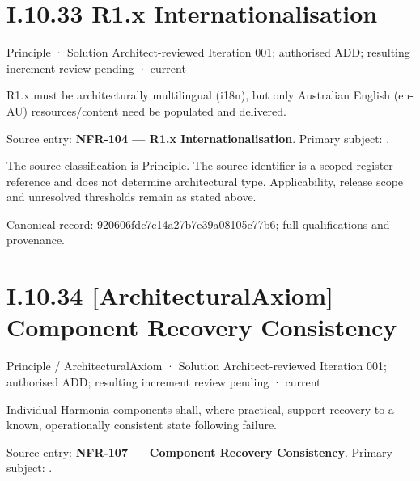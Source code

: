 \section*{I.10.33 R1.x Internationalisation}
\label{navigation:I.10.33}

\label{element:920606fdc7c14a27b7e39a08105c77b6}
{\small Principle · Solution Architect-reviewed Iteration 001; authorised ADD; resulting increment review pending · current}\par

R1.x must be architecturally multilingual (i18n), but only Australian English (en-AU) resources/content need be populated and delivered.



Source entry: \textbf{NFR-104 — R1.x Internationalisation}. Primary subject: \texttt{}.



The source classification is Principle. The source identifier is a scoped register reference and does not determine architectural type. Applicability, release scope and unresolved thresholds remain as stated above.


{\footnotesize \href{../../../../continuum/motivation/principle/920606fdc7c14a27b7e39a08105c77b6.md}{Canonical record: 920606fdc7c14a27b7e39a08105c77b6}; full qualifications and provenance.}\par
\section*{I.10.34 [ArchitecturalAxiom] Component Recovery Consistency}
\label{navigation:I.10.34}

\label{element:545465b03f794a509c932bd3126fbe57}
{\small Principle / ArchitecturalAxiom · Solution Architect-reviewed Iteration 001; authorised ADD; resulting increment review pending · current}\par

Individual Harmonia components shall, where practical, support recovery to a known, operationally consistent state following failure.



Source entry: \textbf{NFR-107 — Component Recovery Consistency}. Primary subject: \texttt{}.



